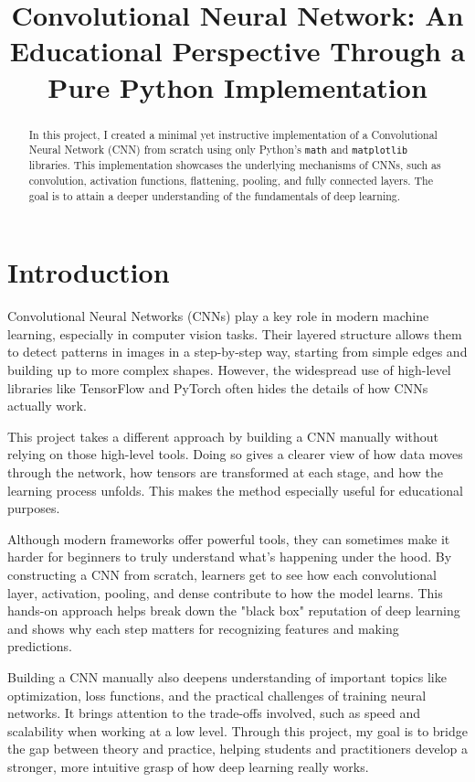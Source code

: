 \documentclass[conference]{IEEEtran}
\title{Convolutional Neural Network: An Educational Perspective Through a Pure Python Implementation}
\author{
  \IEEEauthorblockN{Bui Tuan Minh}
  \IEEEauthorblockA{
    \textit{Department of Information and Communication Technology} \\
    \textit{University of Science and Technology of Hanoi} \\
    Email: minhbt2440041@usth.edu.vn}
}
\begin{document}
\maketitle

\begin{abstract}
In this project, I created a minimal yet instructive implementation of a Convolutional Neural Network (CNN) from scratch using only Python's \texttt{math} and \texttt{matplotlib} libraries. This implementation showcases the underlying mechanisms of CNNs, such as convolution, activation functions, flattening, pooling, and fully connected layers. The goal is to attain a deeper understanding of the fundamentals of deep learning.
\end{abstract}

\section{Introduction}
Convolutional Neural Networks (CNNs) play a key role in modern machine learning, especially in computer vision tasks. Their layered structure allows them to detect patterns in images in a step-by-step way, starting from simple edges and building up to more complex shapes. However, the widespread use of high-level libraries like TensorFlow and PyTorch often hides the details of how CNNs actually work.

This project takes a different approach by building a CNN manually without relying on those high-level tools. Doing so gives a clearer view of how data moves through the network, how tensors are transformed at each stage, and how the learning process unfolds. This makes the method especially useful for educational purposes.

Although modern frameworks offer powerful tools, they can sometimes make it harder for beginners to truly understand what’s happening under the hood. By constructing a CNN from scratch, learners get to see how each convolutional layer, activation, pooling, and dense contribute to how the model learns. This hands-on approach helps break down the "black box" reputation of deep learning and shows why each step matters for recognizing features and making predictions.

Building a CNN manually also deepens understanding of important topics like optimization, loss functions, and the practical challenges of training neural networks. It brings attention to the trade-offs involved, such as speed and scalability when working at a low level. Through this project, my goal is to bridge the gap between theory and practice, helping students and practitioners develop a stronger, more intuitive grasp of how deep learning really works.
\end{document}

